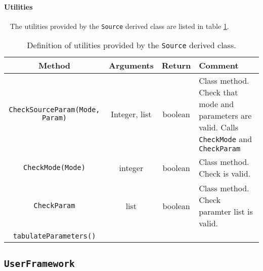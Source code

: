 \paragraph{Utilities} ~\newline
\noindent
The utilities provided by the \texttt{Source} derived class are listed
in table \ref{Tab:Source:Utils}.
\begin{table}[h]
  \caption{
    Definition of utilities provided by the \texttt{Source}
    derived class. 
  }
  \label{Tab:Source:Utils}
  \begin{center}
    \begin{tabular}{|c|c|c|p{5cm}|}
      \hline
      \textbf{Method} & \textbf{Arguments} & \textbf{Return}  & \textbf{Comment}                                                 \\
      \hline
      \texttt{CheckSourceParam(Mode, Param)} & Integer, list & boolean & Class method. Check that mode and parameters are valid.
                                                                         Calls \texttt{CheckMode} and \texttt{CheckParam}                  \\
      \texttt{CheckMode(Mode)}               & integer & boolean       & Class method. Check is valid.                                     \\
      \texttt{CheckParam}                    & list    & boolean       & Class method. Check paramter list is valid.                       \\
      \texttt{tabulateParameters()} &         &               &                                                             \\
      \hline
    \end{tabular}
  \end{center}
\end{table}

\subsection{\texttt{UserFramework}}
\label{SubSubSect:UsrFrmwrk}

